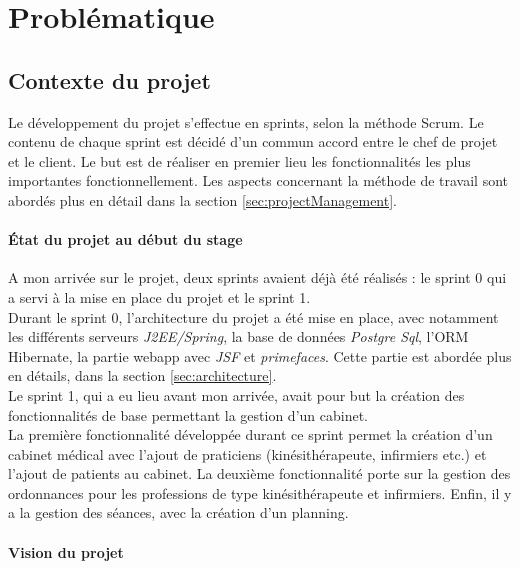\newpage
\section{Problématique} %

\subsection{Contexte du projet}
Le développement du projet s'effectue en sprints, selon la méthode Scrum. Le contenu de chaque sprint est décidé d'un commun accord entre le chef de projet et le client. Le but est de réaliser en premier lieu les fonctionnalités les plus importantes fonctionnellement. 
Les aspects concernant la méthode de travail sont abordés plus en détail dans la section \ref{sec:projectManagement}.

\paragraph*{État du projet au début du stage\\}
A mon arrivée sur le projet, deux sprints avaient déjà été réalisés : le sprint 0 qui a servi à la mise en place du projet et le sprint 1.\\

Durant le sprint 0, l'architecture du projet a été mise en place, avec notamment les différents serveurs \textit{J2EE/Spring}, la base de données \textit{Postgre Sql}, l'\gls{ORM} Hibernate, la partie webapp avec \textit{JSF} et \textit{primefaces}.
Cette partie est abordée plus en détails, dans la section \ref{sec:architecture}.\\

Le sprint 1, qui a eu lieu avant mon arrivée, avait pour but la création des fonctionnalités de base permettant la gestion d'un cabinet.\\
La première fonctionnalité développée durant ce sprint permet la création d'un cabinet médical avec l'ajout de praticiens (kinésithérapeute, infirmiers etc.) et l'ajout de patients au cabinet.
La deuxième fonctionnalité porte sur la gestion des ordonnances pour les professions de type kinésithérapeute et infirmiers. Enfin, il y a la gestion des séances, avec la création d'un planning.

\paragraph*{Vision du projet\\}

